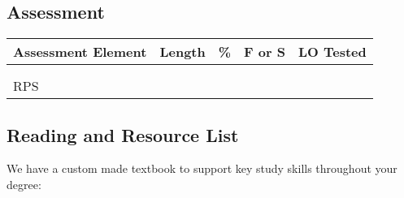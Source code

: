 \documentclass[
  11pt,
  letterpaper,
  oneside,
  open=any]{scrbook}
\begin{document}
\hypertarget{assessment}{%
\subsection{Assessment}\label{assessment}}

\begin{longtable}[]{@{}lllll@{}}
\toprule()
Assessment Element & Length & \% & F or S & LO Tested \\
\midrule()
\endhead
& & & & \\
& & & & \\
RPS & & & & \\
\bottomrule()
\end{longtable}

\hypertarget{reading-and-resource-list}{%
\subsection{Reading and Resource List}\label{reading-and-resource-list}}

We have a custom made textbook to support key study skills throughout
your degree:

\newpage
\end{document}
